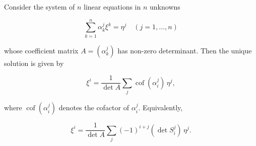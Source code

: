 Consider the system of $n$ linear equations in $n$ unknowns

$$\sum_{k=1}^{n} \alpha_k^j \xi^k = \eta^j \quad (j = 1, \ldots, n)$$

whose coefficient matrix $A = (\alpha_k^j)$ has non-zero determinant. Then the unique solution is given by

$$\xi^i = \frac{1}{\det A} \sum_{j} \operatorname{cof}(\alpha_i^j) \, \eta^j,$$

where $\operatorname{cof}(\alpha_i^j)$ denotes the cofactor of $\alpha_i^j$. Equivalently,

$$\xi^i = \frac{1}{\det A} \sum_{j} (-1)^{i+j} (\det S_i^j) \, \eta^j.$$
